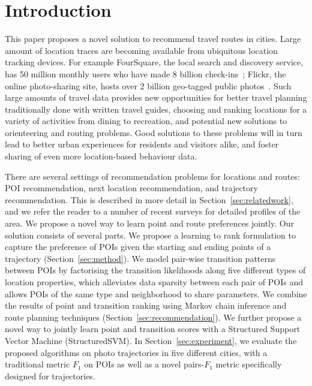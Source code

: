 
\section{Introduction}
\label{sec:intro}

This paper proposes a novel solution to recommend travel routes in cities.
Large amount of location traces are becoming available from ubiquitous location tracking devices.
For example FourSquare, the local search and discovery service, has 50 million monthly users who have made 8 billion check-ins~\cite{4sq}; Flickr, the online photo-sharing site, hosts over 2 billion geo-tagged public photos~\cite{flickr}. Such large amounts of travel data provides new opportunities for better
travel planning traditionally done with written travel guides,
choosing and ranking locations for a variety of activities from dining to recreation,
and potential new solutions to orienteering and routing problems.
Good solutions to these problems will in turn lead to better urban experiences for residents and visitors alike, and foster sharing of even more location-based behaviour data.

There are several settings of recommendation problems for locations and routes: POI recommendation,
next location recommendation, and trajectory recommendation. This is described in more detail in
Section~\ref{sec:relatedwork}, and we refer the reader to a number of recent
surveys\cite{bao2015recommendations,zheng2015trajectory,zheng2014urban}
for detailed profiles of the area.
We propose a novel way to learn point and route preferences jointly.
Our solution consists of several parts.
We propose a learning to rank formulation to capture the preference of POIs given the starting and ending points of a trajectory (Section~\ref{sec:method}).
We model pair-wise transition patterns between POIs by factorising the transition likelihoods along five different types of location properties,
which alleviates data sparsity between each pair of POIs and allows POIs of the same type and neighborhood to share parameters.
We combine the results of point and transition ranking using Markov chain inference and route planning techniques (Section~\ref{sec:recommendation}). We further propose a novel way to jointly learn point and transition scores with a Structured Support Vector Machine (StructuredSVM). In Section~\ref{sec:experiment},
we evaluate the proposed algorithms on photo trajectories in five different cities, with a traditional metric $F_1$ on POIs as well as a novel pairs-$F_1$ metric specifically designed for trajectories.

